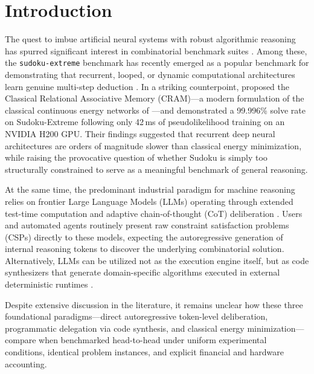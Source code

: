 \documentclass{article} %
\begin{document}
\section{Introduction}
\label{sec:intro}

The quest to imbue artificial neural systems with robust algorithmic reasoning has spurred significant interest in combinatorial benchmark suites \citep{velickovic2022clrs,dehghani2018universal,schwarzschild2021can}. Among these, the \texttt{sudoku-extreme} benchmark \citep{sapientinc_sudoku_extreme} has recently emerged as a popular benchmark for demonstrating that recurrent, looped, or dynamic computational architectures learn genuine multi-step deduction \citep{banino2021pico,bansal2022end}. In a striking counterpoint, \citet{hoover2026classical} proposed the Classical Relational Associative Memory (CRAM)---a modern formulation of the classical continuous energy networks of \citet{hopfield1985neural}---and demonstrated a 99.996\% solve rate on Sudoku-Extreme following only 42\,ms of pseudolikelihood training on an NVIDIA H200 GPU. Their findings suggested that recurrent deep neural architectures are orders of magnitude slower than classical energy minimization, while raising the provocative question of whether Sudoku is simply too structurally constrained to serve as a meaningful benchmark of general reasoning.

At the same time, the predominant industrial paradigm for machine reasoning relies on frontier Large Language Models (LLMs) operating through extended test-time computation and adaptive chain-of-thought (CoT) deliberation \citep{wei2022chain,snell2024scaling}. Users and automated agents routinely present raw constraint satisfaction problems (CSPs) directly to these models, expecting the autoregressive generation of internal reasoning tokens to discover the underlying combinatorial solution. Alternatively, LLMs can be utilized not as the execution engine itself, but as code synthesizers that generate domain-specific algorithms executed in external deterministic runtimes \citep{chen2021codex,gao2023pal}.

Despite extensive discussion in the literature, it remains unclear how these three foundational paradigms---direct autoregressive token-level deliberation, programmatic delegation via code synthesis, and classical energy minimization---compare when benchmarked head-to-head under uniform experimental conditions, identical problem instances, and explicit financial and hardware accounting.
\end{document}
